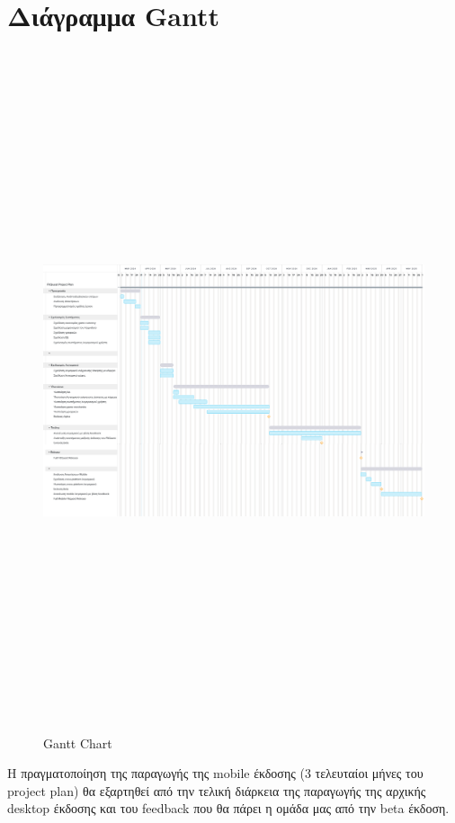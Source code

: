 \section{Διάγραμμα Gantt}
\begin{figure}[!htb]
  \centering
    \centering
    \includegraphics[width=18Cm,height=20cm]{project-gant-updates.jpg}
    \caption{Gantt Chart}
    \label{}
\end{figure}
\begin{flushleft}
Η πραγματοποίηση της παραγωγής της mobile έκδοσης (3 τελευταίοι μήνες του project plan) θα εξαρτηθεί από την τελική διάρκεια της παραγωγής της αρχικής desktop έκδοσης και του feedback που θα πάρει η ομάδα μας από την beta έκδοση.
\end{flushleft}